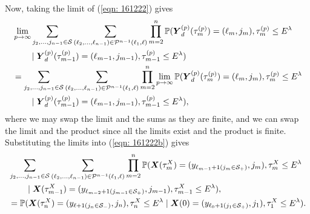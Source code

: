 Now, taking the limit of (\ref{eqn: 161222}) gives 
\begin{align}
	&\lim_{p\to\infty}\sum_{j_2,\dots,j_{n-1}\in\mathcal S}\sum_{(\ell_2,\dots,\ell_{n-1}) \in\mathcal P^{n-1}(\ell_1,\ell)}\prod_{m=2}^{n}\mathbb P(\boldsymbol Y_d^{(p)}(\tau_m^{(p)}) = (\ell_m, j_m), \tau_{m}^{(p)}\leq E^\lambda \nonumber
            	 \\&\qquad\mid \boldsymbol Y_d^{(p)}(\tau_{m-1}^{(p)}) = (\ell_{m-1}, j_{m-1}), \tau_{m-1}^{(p)}\leq E^\lambda) \nonumber 
	\\ &=\sum_{j_2,\dots,j_{n-1}\in\mathcal S}\sum_{(\ell_2,\dots,\ell_{n-1}) \in\mathcal P^{n-1}(\ell_1,\ell)}\prod_{m=2}^{n}\lim_{p\to\infty} \mathbb P(\boldsymbol Y_d^{(p)}(\tau_m^{(p)}) = (\ell_m, j_m), \tau_{m}^{(p)}\leq E^\lambda \nonumber
            	 \\&\qquad \mid \boldsymbol Y_d^{(p)}(\tau_{m-1}^{(p)}) = (\ell_{m-1}, 
	 	 j_{m-1}), \tau_{m-1}^{(p)}\leq E^\lambda),
	 \label{eqn: 161222b}
\end{align}
where we may swap the limit and the sums as they are finite, and we can swap the limit and the product since all the limits exist and the product is finite. Substituting the limits into (\ref{eqn: 161222b}) gives 
\begin{align}
	&\sum_{j_2,\dots,j_{n-1}\in\mathcal S}\sum_{(\ell_2,\dots,\ell_{n-1})  \in\mathcal P^{n-1}(\ell_1,\ell)} \prod_{m=2}^{n}\mathbb P(\boldsymbol X(\tau_m^X) = (y_{\ell_{m-1}+1(j_{m}\in\mathcal S_+)}, j_m), \tau_{m}^X\leq E^\lambda \nonumber
            	\\&\qquad \mid \boldsymbol X(\tau_{m-1}^X)=(y_{\ell_{m-2}+1(j_{m-1}\in\mathcal S_+)},j_{m-1}),\tau_{m-1}^X\leq E^\lambda),\nonumber
		\\&= \mathbb P(\boldsymbol X(\tau_n^X) = (y_{\ell+1(j_{n}\in\mathcal S_-)}, 
		j_n), \tau_{n}^X\leq E^\lambda \mid \boldsymbol X(0)=(y_{\ell_{0}+1(j_{1}\in\mathcal S_+)},
		j_{1}), 
		\tau_1^X\leq E^\lambda).
\end{align}

